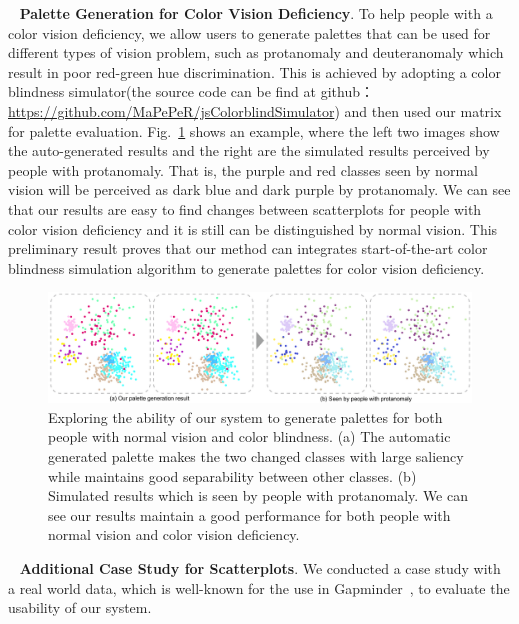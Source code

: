 \documentclass[review,onecolumn]{vgtc}                %
\newcommand{\myparagraph}[1]{\mbox{\ } \newline \noindent \textbf{#1}}
\renewcommand{\paragraph}[1]{\myparagraph{#1}}
\begin{document}
\paragraph{Palette Generation for Color Vision Deficiency}.
To help people with a color vision deficiency, we allow users to generate palettes that can be used for different types of vision problem, such as protanomaly and deuteranomaly which result in poor red-green hue discrimination. This is achieved by adopting a color blindness simulator(the source code can be find at github： \url{https://github.com/MaPePeR/jsColorblindSimulator}) and then used our matrix for palette evaluation. Fig.~\ref{fig:blindness} shows an example, where the left two images show the auto-generated results and the right are the simulated results perceived by people with protanomaly. That is, the purple and red classes seen by normal vision will be perceived as dark blue and dark purple by protanomaly. We can see that our results are easy to find changes between scatterplots for people with color vision deficiency and it is still can be distinguished by normal vision. This preliminary result proves that our method can integrates start-of-the-art color blindness simulation algorithm to generate palettes for color vision deficiency.

\begin{figure}[ht]
\centering
\includegraphics[width=0.96\linewidth]{blindness.pdf}
\caption{Exploring the ability of our system to generate palettes for both people with normal vision and color blindness. (a) The automatic generated palette makes the two changed classes with large saliency while maintains good separability between other classes. (b) Simulated results which is seen by people with protanomaly. We can see our results maintain a good performance for both people with normal vision and color vision deficiency.}
\vspace*{-3mm}
\label{fig:blindness}
\end{figure}


\paragraph{Additional Case Study for Scatterplots}.
We conducted a case study with a real world data, which is well-known for the use in Gapminder~\cite{gapminder}, to evaluate the usability of our system.
\end{document}
